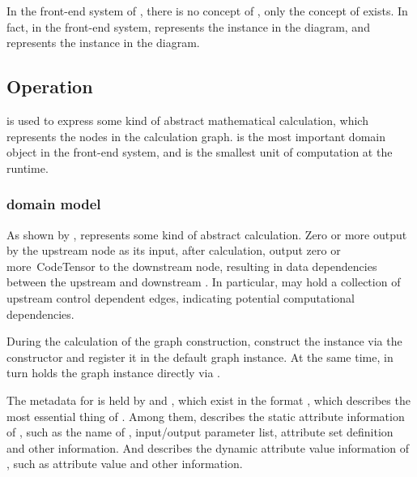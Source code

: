 \begin{content}

In the front-end system of , there is no concept of , only the concept of  exists. In fact, in the front-end  system,  represents the  instance in the diagram, and  represents the  instance in the diagram.

\subsection{Operation}

 is used to express some kind of abstract mathematical calculation, which represents the nodes in the calculation graph.  is the most important domain object in the front-end  system, and is the smallest unit of computation at the \tf{} runtime.

\subsubsection{domain model}

As shown by ,  represents some kind of abstract calculation. Zero or more  output by the upstream node as its input, after calculation, output zero or more\ Code{Tensor} to the downstream node, resulting in data dependencies between the upstream and downstream . In particular,  may hold a collection of upstream control dependent edges, indicating potential computational dependencies.

During the calculation of the graph construction, construct the  instance via the  constructor and register it in the default graph instance. At the same time,  in turn holds the graph instance directly via .

The metadata for  is held by  and , which exist in the format , which describes the most essential thing of . Among them,  describes the static attribute information of , such as the name of , input/output parameter list, attribute set definition and other information. And  describes the dynamic attribute value information of , such as attribute value and other information.


\end{content}

